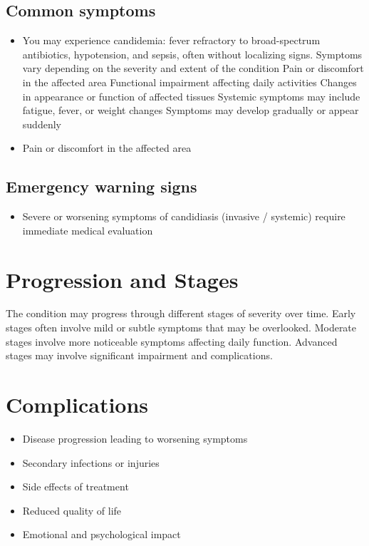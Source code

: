 \subsection{Common symptoms}
\begin{itemize}[noitemsep]
  \item You may experience candidemia: fever refractory to broad-spectrum antibiotics, hypotension, and sepsis, often without localizing signs. Symptoms vary depending on the severity and extent of the condition Pain or discomfort in the affected area Functional impairment affecting daily activities Changes in appearance or function of affected tissues Systemic symptoms may include fatigue, fever, or weight changes Symptoms may develop gradually or appear suddenly
  \item Pain or discomfort in the affected area
  \end{itemize}

\subsection{Emergency warning signs}
\begin{itemize}[noitemsep]
  \item Severe or worsening symptoms of candidiasis (invasive / systemic) require immediate medical evaluation
\end{itemize}
\section{Progression and Stages}
The condition may progress through different stages of severity over time. Early stages often involve mild or subtle symptoms that may be overlooked. Moderate stages involve more noticeable symptoms affecting daily function. Advanced stages may involve significant impairment and complications.
\section{Complications}
\begin{itemize}[noitemsep]
  \item Disease progression leading to worsening symptoms
  \item Secondary infections or injuries
  \item Side effects of treatment
  \item Reduced quality of life
  \item Emotional and psychological impact
\end{itemize}
